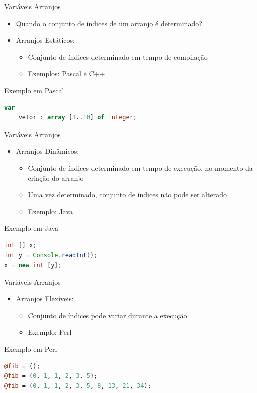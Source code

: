 \documentclass[handout]{beamer}
\begin{document}
\begin{frame}[fragile]{Variáveis Arranjos}

\begin{itemize}
    \item Quando o conjunto de índices de um arranjo é determinado?

    \item Arranjos Estáticos:
    \begin{itemize}
        \item Conjunto de índices determinado em tempo de compilação
        \item Exemplos: Pascal e C++
    \end{itemize}
\end{itemize}
\begin{block}{Exemplo em Pascal}
    \begin{lstlisting}[language=Pascal,numbers=none]
    var
    vetor : array [1..10] of integer;
    \end{lstlisting}
\end{block}
\end{frame}


\begin{frame}[fragile]{Variáveis Arranjos}
\begin{itemize}
\item Arranjos Dinâmicos:
\begin{itemize}
    \item Conjunto de índices determinado em tempo de execução, no momento da criação do arranjo
    \item Uma vez determinado, conjunto de índices não pode ser alterado
    \item Exemplo: Java
\end{itemize}
\end{itemize}
\begin{block}{Exemplo em Java}
\begin{lstlisting}[language=Java,numbers=none]
int [] x;
int y = Console.readInt();
x = new int [y];
\end{lstlisting}
\end{block}
\end{frame}



\begin{frame}[fragile]{Variáveis Arranjos}
\begin{itemize}
\item Arranjos Flexíveis:
\begin{itemize}
\item Conjunto de índices  pode variar durante a execução
\item Exemplo: Perl
\end{itemize}
\end{itemize}

\begin{block}{Exemplo em Perl}
\begin{lstlisting}[language=Perl,numbers=none]
@fib = ();
@fib = (0, 1, 1, 2, 3, 5);
@fib = (0, 1, 1, 2, 3, 5, 8, 13, 21, 34);
\end{lstlisting}
\end{block}
\end{frame}
\end{document}
